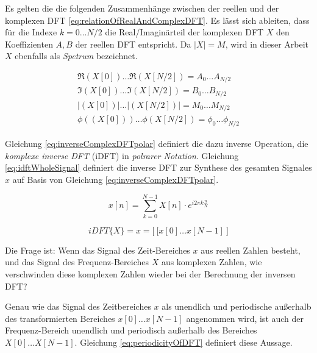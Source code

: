 Es gelten die die folgenden Zusammenhänge zwischen der reellen und der komplexen DFT \ref{eq:relationOfRealAndComplexDFT}. Es lässt sich ableiten, dass für die Indexe $k = 0 \ldots N/2$ die Real/Imaginärteil der komplexen DFT $X$ den Koeffizienten $A,B$ der reellen DFT entspricht. Da $|X| = M$, wird in dieser Arbeit $X$ ebenfalls als \emph{Spetrum} bezeichnet. \cite[S. 225 - 226, 555]{dspGuide}

\begin{equation}
\begin{gathered}
\Re(X[0]) \ldots \Re(X[N/2]) = A_0 \ldots A_{N/2} \\
\Im(X[0]) \ldots \Im(X[N/2]) = B_0 \ldots B_{N/2}  \\
|(X[0])| \ldots |(X[N/2])| = M_0 \ldots M_{N/2} \\
\phi((X[0])) \ldots \phi(X[N/2]) = \phi_0 \ldots \phi_{N/2} 
\end{gathered}
\label{eq:relationOfRealAndComplexDFT}
\end{equation}

Gleichung \ref{eq:inverseComplexDFTpolar} definiert die dazu inverse Operation, die \emph{komplexe inverse DFT} (iDFT) in \emph{polrarer Notation}. \cite[S. 572]{dspGuide} Gleichung \ref{eq:idftWholeSignal} definiert die inverse DFT zur Synthese des gesamten Signales $x$ auf Basis von Gleichung \ref{eq:inverseComplexDFTpolar}.

\begin{equation}
\label{eq:inverseComplexDFTpolar}
x[n] =  \sum_{k = 0}^{N-1}  X[n] \cdot e^{i 2\pi k \frac{n}{N}}
\end{equation}

\begin{equation}
iDFT\{X\} = x = \big[ \: [ x[0] \ldots x[N-1] \: \big]
\label{eq:idftWholeSignal}
\end{equation}

Die Frage ist: Wenn das Signal des Zeit-Bereiches $x$  aus reellen Zahlen besteht, und das Signal des Frequenz-Bereiches $X$ aus komplexen Zahlen, wie \glqq verschwinden \glqq{} diese komplexen Zahlen wieder bei der Berechnung der inversen DFT? 

Genau wie das Signal des Zeitbereiches $x$ als unendlich und periodische außerhalb des transformierten Bereiches $x[0] \ldots x[N-1]$ angenommen wird, ist auch der Frequenz-Bereich unendlich und periodisch außerhalb des Bereiches $X[0] \ldots X[N-1] $. Gleichung  \ref{eq:periodicityOfDFT}  definiert diese Aussage. \cite[S. 572]{dspGuide}

